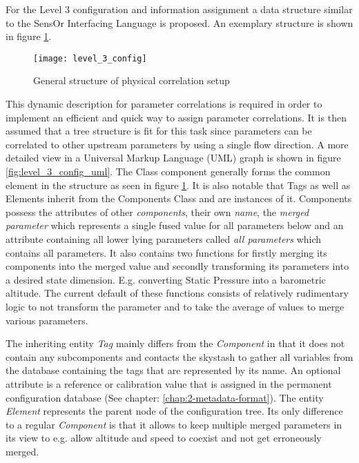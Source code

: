 For the Level 3 configuration and information assignment a data structure similar to the SensOr Interfacing Language is proposed. An exemplary structure is shown in figure \ref{fig:level_3_config}.
\begin{figure}
    \centering
    \texttt{[image: level\_3\_config]}
    \caption{General structure of physical correlation setup}
    \label{fig:level_3_config}
\end{figure}

This dynamic description for parameter correlations is required in order to implement an efficient and quick way to assign parameter correlations. It is then assumed that a tree structure is fit for this task since parameters can be correlated to other upstream parameters by using a single flow direction. A more detailed view in a Universal Markup Language (UML) graph is shown in figure \ref{fig:level_3_config_uml}. The Class component generally forms the common element in the structure as seen in figure \ref{fig:level_3_config}. It is also notable that Tags as well as Elements inherit from the Components Class and are instances of it. Components possess the attributes of other \textit{components}, their own \textit{name}, the \textit{merged parameter} which represents a single fused value for all parameters below and an attribute containing all lower lying parameters called \textit{all parameters} which contains all parameters. It also contains two functions for firstly merging its components into the merged value and secondly transforming its parameters into a desired state dimension. E.g. converting Static Pressure into a barometric altitude. The current default of these functions consists of relatively rudimentary logic to not transform the parameter and to take the average of values to merge various parameters.

The inheriting entity \textit{Tag} mainly differs from the \textit{Component} in that it does not contain any subcomponents and contacts the skystash to gather all variables from the database containing the tags that are represented by its name. An optional attribute is a reference or calibration value that is assigned in the permanent configuration database (See chapter: \ref{chap:2-metadata-format}).
The entity \textit{Element} represents the parent node of the configuration tree. Its only difference to a regular \textit{Component} is that it allows to keep multiple merged parameters in its view to e.g. allow altitude and speed to coexist and not get erroneously merged.

